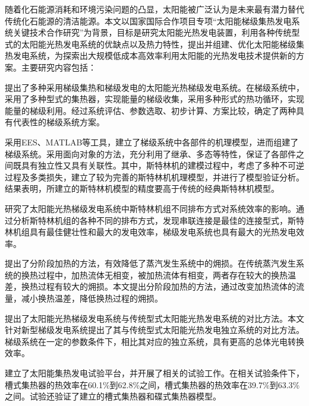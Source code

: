 {随着化石能源消耗和环境污染问题的凸显，太阳能被广泛认为是未来最有潜力替代传统化石能源的清洁能源。本文以国家国际合作项目专项“太阳能梯级集热发电系统关键技术合作研究”为背景，目标是研究太阳能光热发电装置，利用各种传统型式的太阳能光热发电系统的优缺点以及热力特性，提出并组建、优化太阳能梯级集热发电系统，为探索出大规模低成本高效率利用太阳能的光热发电技术提供新的方案。主要研究内容包括：

提出了多种采用梯级集热和梯级发电的太阳能光热梯级发电系统。在梯级系统中，采用了多种型式的集热器，实现能量的梯级收集，采用多种形式的热功循环，实现能量的梯级利用。经过系统评估、参数选取、初步计算、方案比较，确定了两种具有代表性的梯级系统方案。

采用EES、MATLAB等工具，建立了梯级系统中各部件的机理模型，进而组建了梯级系统。采用面向对象的方法，充分利用了继承、多态等特性，保证了各部件之间既具有独立性又具有关联性。其中，斯特林机的建模过程中，考虑了多种不可逆过程及多类损失，建立了较为完善的斯特林机机理模型，并进行了模型验证分析。结果表明，所建立的斯特林机模型的精度要高于传统的经典斯特林机模型。

研究了太阳能光热梯级发电系统中斯特林机组不同排布方式对系统效率的影响。通过分析斯特林机组的各种不同的排布方式，发现串联连接是最佳的连接型式，斯特林机组具有最佳健壮性和最大的发电效率，梯级发电系统也具有最大的光热发电效率。

提出了分阶段加热的方法，有效降低了蒸汽发生系统中的㶲损。在传统蒸汽发生系统的换热过程中，加热流体无相变，被加热流体有相变，两者存在较大的换热温差，换热过程有较大的㶲损。本文提出分阶段加热的方法，通过改变加热流体的流量，减小换热温差，降低换热过程的㶲损。

提出了太阳能光热梯级发电系统与传统型式太阳能光热发电系统的对比方法。本文针对新型梯级发电系统提出了其与传统型式太阳能光热发电独立系统的对比方法。梯级系统在一定的参数条件下，相比其对应的独立系统，具有更高的总体光电转换效率。

建立了太阳能集热发电试验平台，并开展了相关的试验工作。在相关试验条件下，槽式集热器的热效率在60.1\%到62.8\%之间，槽式集热器的热效率在39.7\%到63.3\%之间。试验还验证了建立的槽式集热器和碟式集热器模型。
}

